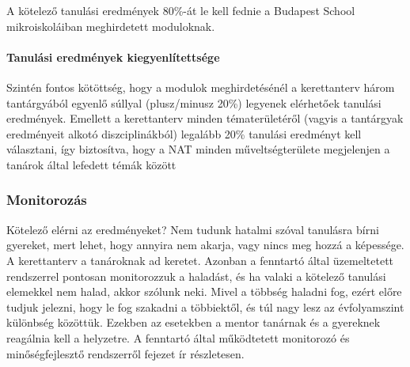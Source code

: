 A kötelező tanulási eredmények 80\%-át le kell fednie a Budapest School
mikroiskoláiban meghirdetett moduloknak.

\paragraph{Tanulási eredmények kiegyenlítettsége}

Szintén fontos kötöttség, hogy a modulok meghirdetésénél a kerettanterv
három tantárgyából egyenlő súllyal (plusz/minusz 20\%) legyenek
elérhetőek tanulási eredmények. Emellett a kerettanterv minden
tématerületéről (vagyis a tantárgyak eredményeit alkotó diszciplinákból)
legalább 20\% tanulási eredményt kell választani, így biztosítva, hogy a
NAT minden műveltségterülete megjelenjen a tanárok által lefedett témák
között

\subsubsection{Monitorozás}

Kötelező elérni az eredményeket? Nem tudunk hatalmi szóval tanulásra
bírni gyereket, mert lehet, hogy annyira nem akarja, vagy nincs meg
hozzá a képessége. A kerettanterv a tanároknak ad keretet. Azonban a
fenntartó által üzemeltetett rendszerrel pontosan monitorozzuk a
haladást, és ha valaki a kötelező tanulási elemekkel nem halad, akkor
szólunk neki. Mivel a többség haladni fog, ezért előre tudjuk jelezni,
hogy le fog szakadni a többiektől, és túl nagy lesz az évfolyamszint
különbség közöttük. Ezekben az esetekben a mentor tanárnak és a
gyereknek reagálnia kell a helyzetre. A fenntartó által működtetett monitorozó
és minőségfejlesztő rendszerről  fejezet ír
részletesen.